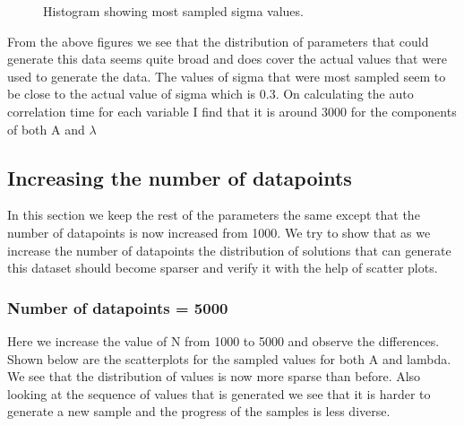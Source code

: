 \documentclass{article}
\begin{document}
\begin{figure}[H]
	\centerline{}
	\caption{Histogram showing most sampled sigma values.}
	\label{1.fig:r1_sigma}
\end{figure}

From the above figures we see that the distribution of parameters that could generate this data seems quite broad and does cover the actual values that were used to generate the data. The values of sigma that were most sampled seem to be close to the actual value of sigma which is 0.3. On calculating the auto correlation time for each variable I find that it is around 3000 for the components of both A and $\lambda$


\subsection{Increasing the number of datapoints} %
In this section we keep the rest of the parameters the same except that the number of datapoints is now increased from 1000. We try to show that as we increase the number of datapoints the distribution of solutions that can generate this dataset should become sparser and verify it with the help of scatter plots.\\

\subsubsection{Number of datapoints = 5000} %
Here we increase the value of N from 1000 to 5000 and observe the differences.
Shown below are the scatterplots for the sampled values for both A and lambda. We see that the distribution of values is now more sparse than before. Also looking at the sequence of values that is generated we see that it is harder to generate a new sample and the progress of the samples is less diverse.
\end{document}

